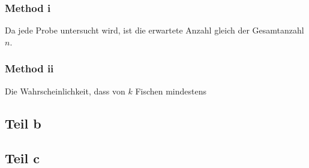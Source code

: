 \documentclass[10pt,a4paper]{article}
\begin{document}
\subsubsection{Method i}
Da jede Probe untersucht wird, ist die erwartete Anzahl gleich der Gesamtanzahl $n$.

\subsubsection{Method ii}
Die Wahrscheinlichkeit, dass von $k$ Fischen mindestens

\subsection{Teil b}

\subsection{Teil c}
\end{document}
